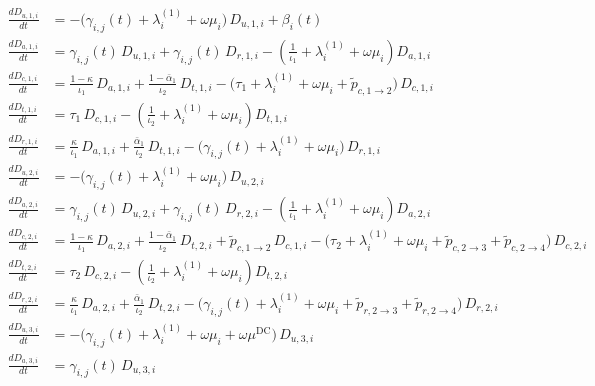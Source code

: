 \begin{align*}
\frac{dD_{u,1,i}}{dt}
  &= -\bigl(\gamma_{i,j}(t) + \lambda_i^{(1)} + \omega\mu_i\bigr)\,D_{u,1,i}
     + \beta_i(t)
\\[0.8em]
\frac{dD_{a,1,i}}{dt}
  &= \gamma_{i,j}(t)\,D_{u,1,i}
     + \gamma_{i,j}(t)\,D_{r,1,i}
     - \left(\frac{1}{\iota_1} + \lambda_i^{(1)} + \omega\mu_i\right)D_{a,1,i}
\\[0.8em]
\frac{dD_{c,1,i}}{dt}
  &= \frac{1-\kappa}{\iota_1}\,D_{a,1,i}
     + \frac{1-\bar{\alpha}_1}{\iota_2}\,D_{t,1,i}
     - \bigl(\tau_1 + \lambda_i^{(1)} + \omega\mu_i + \tilde{p}_{c,1\to2}\bigr)\,D_{c,1,i}
\\[0.8em]
\frac{dD_{t,1,i}}{dt}
  &= \tau_1\,D_{c,1,i}
     - \left(\frac{1}{\iota_2} + \lambda_i^{(1)} + \omega\mu_i\right)D_{t,1,i}
\\[0.8em]
\frac{dD_{r,1,i}}{dt}
  &= \frac{\kappa}{\iota_1}\,D_{a,1,i}
     + \frac{\bar{\alpha}_1}{\iota_2}\,D_{t,1,i}
     - \bigl(\gamma_{i,j}(t) + \lambda_i^{(1)} + \omega\mu_i\bigr)\,D_{r,1,i}
\\[1.2em]
\frac{dD_{u,2,i}}{dt}
  &= -\bigl(\gamma_{i,j}(t) + \lambda_i^{(1)} + \omega\mu_i\bigr)\,D_{u,2,i}
\\[0.8em]
\frac{dD_{a,2,i}}{dt}
  &= \gamma_{i,j}(t)\,D_{u,2,i}
     + \gamma_{i,j}(t)\,D_{r,2,i}
     - \left(\frac{1}{\iota_1} + \lambda_i^{(1)} + \omega\mu_i\right)D_{a,2,i}
\\[0.8em]
\frac{dD_{c,2,i}}{dt}
  &= \frac{1-\kappa}{\iota_1}\,D_{a,2,i}
     + \frac{1-\bar{\alpha}_1}{\iota_2}\,D_{t,2,i}
     + \tilde{p}_{c,1\to2}\,D_{c,1,i}
     - \bigl(\tau_2 + \lambda_i^{(1)} + \omega\mu_i 
             + \tilde{p}_{c,2\to3} + \tilde{p}_{c,2\to4}\bigr)\,D_{c,2,i}
\\[0.8em]
\frac{dD_{t,2,i}}{dt}
  &= \tau_2\,D_{c,2,i}
     - \left(\frac{1}{\iota_2} + \lambda_i^{(1)} + \omega\mu_i\right)D_{t,2,i}
\\[0.8em]
\frac{dD_{r,2,i}}{dt}
  &= \frac{\kappa}{\iota_1}\,D_{a,2,i}
     + \frac{\bar{\alpha}_1}{\iota_2}\,D_{t,2,i}
     - \bigl(\gamma_{i,j}(t) + \lambda_i^{(1)} + \omega\mu_i
             + \tilde{p}_{r,2\to3} + \tilde{p}_{r,2\to4}\bigr)\,D_{r,2,i}
\\[1.2em]
\frac{dD_{u,3,i}}{dt}
  &= -\bigl(\gamma_{i,j}(t) + \lambda_i^{(1)} + \omega\mu_i
            + \omega\mu^{\mathrm{DC}}\bigr)\,D_{u,3,i}
\\[0.8em]
\frac{dD_{a,3,i}}{dt}
  &= \gamma_{i,j}(t)\,D_{u,3,i}

\end{align*}
